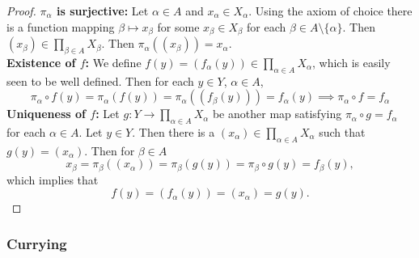 \begin{proof}
    \textbf{$\pi_\alpha$ is surjective:} Let $\alpha \in A$ and $x_\alpha \in X_\alpha$. Using the axiom of choice there is a function mapping $\beta \mapsto x_\beta$ for some $x_\beta \in X_\beta$ for each $\beta\in A\setminus \{\alpha\}$. Then $(x_\beta)\in \prod_{\beta\in A} X_\beta$. Then $\pi_\alpha((x_\beta))=x_\alpha$.\\  
    \textbf{Existence of $f$:} We define $f(y) = (f_\alpha(y))\in \prod_{\alpha\in A} X_\alpha$, which is easily seen to be well defined. Then for each $y\in Y$, $\alpha \in A$,
    $$\pi_\alpha\circ f(y) = \pi_\alpha(f(y))=\pi_\alpha((f_\beta(y)))=f_\alpha(y) \implies \pi_\alpha\circ f = f_\alpha$$
    \textbf{Uniqueness of $f$:} Let $g : Y \rightarrow \prod_{\alpha\in A} X_\alpha$ be another map satisfying $\pi_\alpha \circ g = f_\alpha$ for each $\alpha \in A$. Let $y\in Y$. Then there is a $(x_\alpha)\in \prod_{\alpha\in A} X_\alpha$ such that $g(y) = (x_\alpha)$. Then for $\beta \in A$
    $$x_\beta = \pi_\beta ((x_\alpha))= \pi_\beta(g(y))=\pi_\beta \circ g(y) = f_\beta(y),$$
    which implies that 
    $$f(y) = (f_\alpha(y))=(x_\alpha)=g(y).$$
\end{proof}
\subsubsection{Currying}